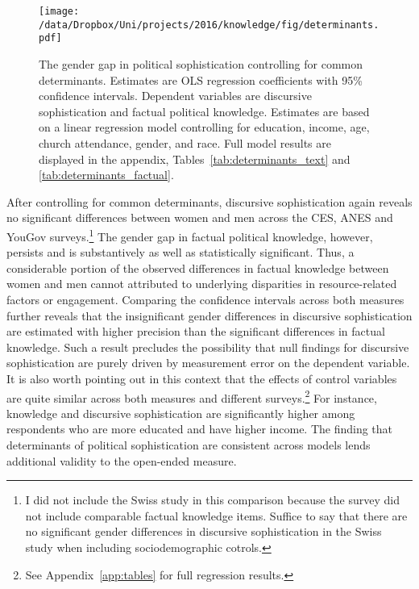 \begin{figure}[h]\centering
\texttt{[image: /data/Dropbox/Uni/projects/2016/knowledge/fig/determinants.pdf]}
\caption[The gender gap in political sophistication after controlling for common determinants.]{The gender gap in political sophistication controlling for common determinants. Estimates are OLS regression coefficients with 95\% confidence intervals. Dependent variables are discursive sophistication and factual political knowledge. Estimates are based on a linear regression model controlling for education, income, age, church attendance, gender, and race. Full model results are displayed in the appendix, Tables~\ref{tab:determinants_text} and \ref{tab:determinants_factual}.}\label{fig:determinants}
\end{figure}

After controlling for common determinants, discursive sophistication again reveals no significant differences between women and men across the CES, ANES and YouGov surveys.\footnote{I did not include the Swiss study in this comparison because the survey did not include comparable factual knowledge items. Suffice to say that there are no significant gender differences in discursive sophistication in the Swiss study when including sociodemographic cotrols.} The gender gap in factual political knowledge, however, persists and is substantively as well as statistically significant. Thus, a considerable portion of the observed differences in factual knowledge between women and men cannot attributed to underlying disparities in resource-related factors or engagement. Comparing the confidence intervals across both measures further reveals that the insignificant gender differences in discursive sophistication are estimated with higher precision than the significant differences in factual knowledge. Such a result precludes the possibility that null findings for discursive sophistication are purely driven by measurement error on the dependent variable. It is also worth pointing out in this context that the effects of control variables are quite similar across both measures and different surveys.\footnote{See Appendix~\ref{app:tables} for full regression results.} For instance, knowledge and discursive sophistication are significantly higher among respondents who are more educated and have higher income. The finding that determinants of political sophistication are consistent across models lends additional validity to the open-ended measure.%

